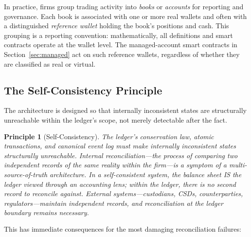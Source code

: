 \documentclass[11pt,a4paper]{article}
\newtheorem{principle}[definition]{Principle}
\begin{document}
In practice, firms group trading activity into \textit{books} or \textit{accounts} for reporting and governance. Each book is associated with one or more real wallets and often with a distinguished \textit{reference wallet} holding the book's positions and cash. This grouping is a reporting convention: mathematically, all definitions and smart contracts operate at the wallet level. The managed-account smart contracts in Section~\ref{sec:managed} act on such reference wallets, regardless of whether they are classified as real or virtual.

\subsection{The Self-Consistency Principle}

The architecture is designed so that internally inconsistent states are structurally unreachable within the ledger's scope, not merely detectable after the fact.

\begin{principle}[Self-Consistency]
The ledger's conservation law, atomic transactions, and canonical event log must make internally inconsistent states structurally unreachable. Internal reconciliation---the process of comparing two independent records of the same reality within the firm---is a symptom of a multi-source-of-truth architecture. In a self-consistent system, the balance sheet IS the ledger viewed through an accounting lens; within the ledger, there is no second record to reconcile against. External systems---custodians, CSDs, counterparties, regulators---maintain independent records, and reconciliation at the ledger boundary remains necessary.
\end{principle}

This has immediate consequences for the most damaging reconciliation failures:
\end{document}
